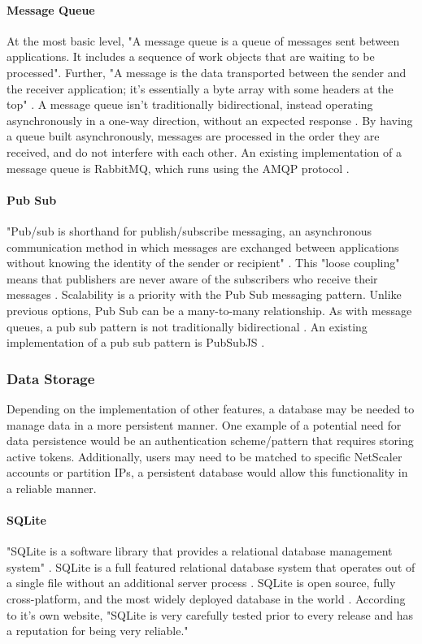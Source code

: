 \paragraph{Message Queue}
At the most basic level, "A message queue is a queue of messages sent between applications. It includes a sequence of work objects that are waiting to be processed".
Further, "A message is the data transported between the sender and the receiver application; it's essentially a byte array with some headers at the top" \cite{cloudamqp}.
A message queue isn't traditionally bidirectional, instead operating asynchronously in a one-way direction, without an expected response \cite{cloudamqp}.
By having a queue built asynchronously, messages are processed in the order they are received, and do not interfere with each other.
An existing implementation of a message queue is RabbitMQ, which runs using the AMQP protocol \cite{cloudamqp}.

\paragraph{Pub Sub}
"Pub/sub is shorthand for publish/subscribe messaging, an asynchronous communication method in which messages are exchanged between applications without knowing the identity of the sender or recipient" \cite{pubsubstack}.
This "loose coupling" means that publishers are never aware of the subscribers who receive their messages \cite{pubsubstack}.
Scalability is a priority with the Pub Sub messaging pattern.
Unlike previous options, Pub Sub can be a many-to-many relationship.
As with message queues, a pub sub pattern is not traditionally bidirectional \cite{pubsubstack}.
An existing implementation of a pub sub pattern is PubSubJS \cite{pubsubjs}.

\subsubsection{Data Storage}
Depending on the implementation of other features, a database may be needed to manage data in a more persistent manner.
One example of a potential need for data persistence would be an authentication scheme/pattern that requires storing active tokens.
Additionally, users may need to be matched to specific NetScaler accounts or partition IPs, a persistent database would allow this functionality in a reliable manner.

\paragraph{SQLite}
"SQLite is a software library that provides a relational database management system" \cite{whatissqlite}.
SQLite is a full featured relational database system that operates out of a single file without an additional server process \cite{whatissqlite}.
SQLite is open source, fully cross-platform, and the most widely deployed database in the world \cite{sqlite}.
According to it's own website, "SQLite is very carefully tested prior to every release and has a reputation for being very reliable." \cite{sqlite}

